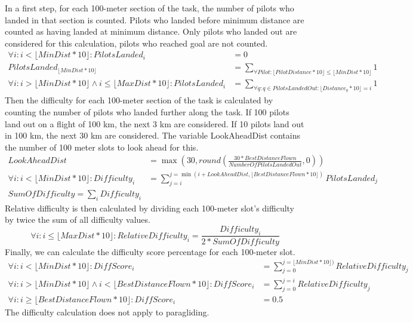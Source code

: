 \documentclass{article}
\begin{document}
In a first step, for each 100-meter section of the task, the number of pilots
who landed in that section is counted. Pilots who landed before minimum
distance are counted as having landed at minimum distance. Only pilots who
landed out are considered for this calculation, pilots who reached goal are not
counted.
\begin{align*}
    \forall i : i < \lfloor MinDist * 10 \rfloor : PilotsLanded_i &= 0 \\
    PilotsLanded_{\lfloor MinDist * 10 \rfloor} &= \sum_{\forall Pilot : \lfloor PilotDistance * 10 \rfloor \leq \lfloor MinDist * 10 \rfloor} 1 \\
    \forall i : i > \lfloor MinDist * 10 \rfloor \land i \leq \lfloor MaxDist * 10 \rfloor : PilotsLanded_i &= \sum_{\forall q : q \in PilotsLandedOut : \lfloor Distance_q * 10 \rfloor = i} 1
\end{align*}
Then the difficulty for each 100-meter section of the task is calculated by
counting the number of pilots who landed further along the task. If 100 pilots
land out on a flight of 100 km, the next 3 km are considered. If 10 pilots land
out in 100 km, the next 30 km are considered. The variable LookAheadDist
contains the number of 100 meter slots to look ahead for this.
\begin{align*}
    LookAheadDist &= \max(30, round(\frac{30 * BestDistanceFlown}{NumberOfPilotsLandedOut}, 0)) \\
    \forall i : i < \lfloor MinDist * 10 \rfloor : Difficulty_i &= \sum_{j = i}^{j = \min(i + LookAheadDist, \lfloor BestDistanceFlown * 10 \rfloor)} PilotsLanded_j \\
    SumOfDifficulty = \sum_i Difficulty_i
\end{align*}
Relative difficulty is then calculated by dividing each 100-meter slot’s difficulty by twice the sum of all
difficulty values.
\[ \forall i : i \leq \lfloor MaxDist * 10 \rfloor : RelativeDifficulty_i = \frac{Difficulty_i}{2 * SumOfDifficulty} \]
Finally, we can calculate the difficulty score percentage for each 100-meter slot.
\begin{align*}
    \forall i : i < \lfloor MinDist * 10 \rfloor : DiffScore_i &= \sum_{j = 0}^{j = \lfloor MinDist * 10 \rfloor)} RelativeDifficulty_j \\
    \forall i : i > \lfloor MinDist * 10 \rfloor \land i < \lfloor BestDistanceFlown * 10 \rfloor : DiffScore_i &= \sum_{j = 0}^{j = i} RelativeDifficulty_j \\
    \forall i : i \geq \lfloor BestDistanceFlown * 10 \rfloor : DiffScore_i &= 0.5
\end{align*}
The difficulty calculation does not apply to paragliding.
\end{document}
